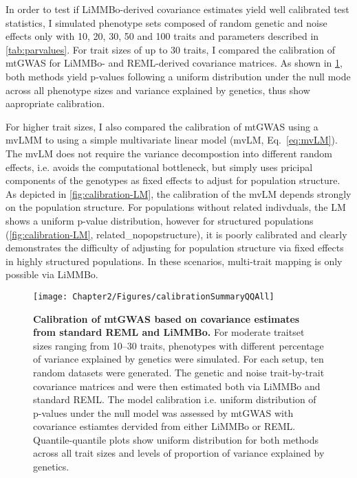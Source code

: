 In order to test if LiMMBo-derived covariance estimates yield well calibrated test statistics, I simulated phenotype sets composed of random genetic and noise effects only with \num{10}, \num{20}, \num{30}, \num{50} and \num{100} traits and parameters described in \cref{tab:parvalues}. For trait sizes of up to \num{30} traits, I compared the calibration of mtGWAS for LiMMBo- and REML-derived covariance matrices. As shown in \cref{fig:calibration}, both methods yield p-values following a uniform distribution under the null mode across all phenotype sizes and variance explained by genetics, thus show aapropriate calibration. 

For higher trait sizes, I also compared the calibration of mtGWAS using a mvLMM to using a simple multivariate linear model (mvLM, Eq.~\ref{eq:mvLM}). The mvLM does not require the variance decompostion into different random effects, i.e. avoids the computational bottleneck, but simply uses pricipal components of the genotypes as fixed effects to adjust for population structure. As depicted in \cref{fig:calibration-LM}, the calibration of the mvLM depends strongly on the population structure. For populations without related indivduals, the LM shows a uniform p-value distribution, however for structured populations (\cref{fig:calibration-LM}, related\_nopopstructure), it is poorly calibrated and clearly demonstrates the difficulty of adjusting for population structure via fixed effects in highly structured populations. In these scenarios, multi-trait mapping is only possible via LiMMBo. 

\begin{figure}[hbtp]
	\centering	
	\texttt{[image: Chapter2/Figures/calibrationSummaryQQAll]}\\
	\caption[\textbf{Calibration of mtGWAS based on covariance estimates from standard REML and LiMMBo.}]{\textbf{Calibration of mtGWAS based on covariance estimates from standard REML and LiMMBo.} For moderate traitset sizes ranging from \numrange{10}{30} traits, phenotypes with different percentage of variance explained by genetics were simulated. For each setup, ten random datasets were generated. The genetic and noise trait-by-trait covariance matrices  and  were then estimated both via LiMMBo and standard REML. The model calibration i.e. uniform distribution of p-values under the null model was assessed by mtGWAS with covariance estiamtes dervided from either LiMMBo or REML. Quantile-quantile plots show uniform distribution for both methods across all trait sizes and levels of proportion of variance explained by genetics.}
	  \label{fig:calibration}%
\end{figure}

